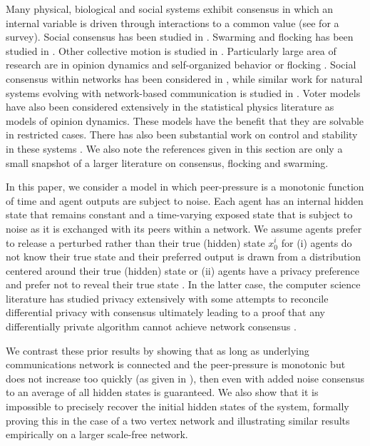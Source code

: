 \documentclass[aps,superscriptaddress,floatfix,amsmath,amssymb]{revtex4-2}
\begin{document}
Many physical, biological and social systems exhibit consensus in which an internal variable is driven through interactions to a common value (see \cite{MT14} for a survey). Social consensus has been studied in  \cite{DeGroot74,Krause00,Centola15}. Swarming and flocking has been studied in \cite{TT98,CS07,EK01,L08,LX10, DM11}. Other collective motion is studied in \cite{MT14,VZ12,OFM07}. Particularly large area of research are in opinion dynamics \cite{DeGroot74,Krause00,HK02,BN05,WDA05,Toscani06,Weisb06,Lorenz07,BHT09,CFL09,KR11,DMPW12,CFT12,JM14,SZAS21,GG21} and self-organized behavior or flocking \cite{CS07,HT08,HL09,CFRT10,MOA10,Hask13,EHS16,VZ12,MT14}. Social consensus within networks has been considered in \cite{DY00,MSC01,OM04,J08,H10,DdGL10,BHT13,AALM21,WSX21,LLL22,HGHY22,HZML22,PSW22}, while similar work for natural systems evolving with network-based communication is studied in \cite{BCCC08,HH08,CCGP10,K21}. Voter models \cite{CFL09,CS73,HL75,SES05} have also been considered extensively in the statistical physics literature as models of opinion dynamics. These models have the benefit that they are solvable in restricted cases. There has also been substantial work on control and stability in these systems \cite{BHOT05,BHT09,JK10,L08,OFM07}. We also note the references given in this section are only a small snapshot of a larger literature on consensus, flocking and swarming. 

In this paper, we consider a model in which peer-pressure is a monotonic function of time \cite{SGSR18, G21} and agent outputs are subject to noise. Each agent has an internal hidden state that remains constant and a time-varying exposed state that is subject to noise as it is exchanged with its peers within a network. We assume agents prefer to release a perturbed rather than their true (hidden) state $x_0^i$ for (i) agents do not know their true state and their preferred output is drawn from a distribution centered around their true (hidden) state or (ii) agents have a privacy preference and prefer not to reveal their true state \cite{lou2017cost,10.14778/1687627.1687719}. In the latter case, the computer science literature has studied privacy extensively with some attempts to reconcile differential privacy with consensus \cite{10.1145/2381966.2381978} ultimately leading to a proof that any differentially private algorithm cannot achieve network consensus \cite{nozari2015differentially}.

We contrast these prior results by showing that as long as underlying communications network is connected and the peer-pressure is monotonic but does not increase too quickly (as given in \cite{G21}), then even with added noise consensus to an average of all hidden states is guaranteed. We also show that it is impossible to precisely recover the initial hidden states of the system, formally proving this in the case of a two vertex network and illustrating similar results empirically on a larger scale-free network.  
\end{document}
